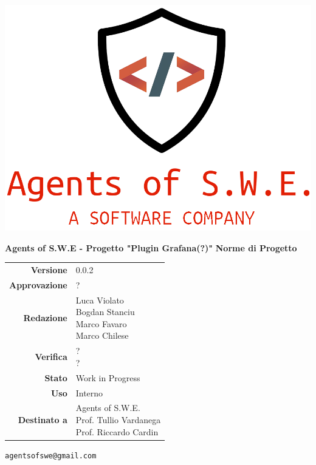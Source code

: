 


\begin{titlepage}
\thispagestyle{empty}

\begin{center}

\includegraphics[scale=0.3]{./images/logo.png} 

\large \textbf{Agents of S.W.E - Progetto "Plugin Grafana(?)"}
\vfill
\Huge \textbf{Norme di Progetto}
\vfill
\large
\renewcommand{\arraystretch}{1.3}
\begin{tabular}{r|l}
\textbf{Versione} & 0.0.2\\
\textbf{Approvazione} & ?\\
\textbf{Redazione} & \parbox[t]{5cm}{Luca Violato\\Bogdan Stanciu\\Marco Favaro\\Marco Chilese}\\\
\textbf{Verifica} & \parbox[t]{5cm}{?\\?}\\
\textbf{Stato} & Work in Progress\\
\textbf{Uso} & Interno\\
\textbf{Destinato a} & \parbox[t]{5cm}{Agents of S.W.E. \\Prof. Tullio Vardanega\\Prof. Riccardo Cardin}
\end{tabular}
\vfill
\small
\texttt{agentsofswe@gmail.com}
\end{center}
\end{titlepage}

